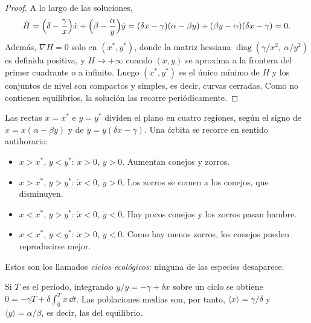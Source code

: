 \begin{proof}
A lo largo de las soluciones,
\[
  \dot H=\Bigl(\delta-\frac{\gamma}{x}\Bigr)\dot x+\Bigl(\beta-\frac{\alpha}{y}\Bigr)\dot y
  =(\delta x-\gamma)(\alpha-\beta y)+(\beta y-\alpha)(\delta x-\gamma)=0 .
\]
Además, $\nabla H=0$ solo en $(x^\ast,y^\ast)$, donde la matriz hessiana $\operatorname{diag}(\gamma/x^2,\ \alpha/y^2)$ es definida positiva, y $H\to+\infty$ cuando $(x,y)$ se aproxima a la frontera del primer cuadrante o a infinito. Luego $(x^\ast,y^\ast)$ es el único mínimo de $H$ y los conjuntos de nivel son compactos y simples, es decir, curvas cerradas. Como no contienen equilibrios, la solución las recorre periódicamente.
\end{proof}

\begin{desarrollo}
Las rectas $x=x^\ast$ e $y=y^\ast$ dividen el plano en cuatro regiones, según el signo de $\dot x=x(\alpha-\beta y)$ y de $\dot y=y(\delta x-\gamma)$. Una órbita se recorre en sentido antihorario:
\begin{itemize}
  \item[\textbf{(I)}] $x>x^\ast$, $y<y^\ast$: $\dot x>0$, $\dot y>0$. Aumentan conejos y zorros.
  \item[\textbf{(II)}] $x>x^\ast$, $y>y^\ast$: $\dot x<0$, $\dot y>0$. Los zorros se comen a los conejos, que disminuyen.
  \item[\textbf{(III)}] $x<x^\ast$, $y>y^\ast$: $\dot x<0$, $\dot y<0$. Hay pocos conejos y los zorros pasan hambre.
  \item[\textbf{(IV)}] $x<x^\ast$, $y<y^\ast$: $\dot x>0$, $\dot y<0$. Como hay menos zorros, los conejos pueden reproducirse mejor.
\end{itemize}
Estos son los llamados \emph{ciclos ecológicos}: ninguna de las especies desaparece.
\end{desarrollo}

\begin{remark}
Si $T$ es el periodo, integrando $\dot y/y=-\gamma+\delta x$ sobre un ciclo se obtiene $0=-\gamma T+\delta\int_0^T x\,\dd t$. Las poblaciones medias son, por tanto, $\langle x\rangle=\gamma/\delta$ y $\langle y\rangle=\alpha/\beta$, es decir, las del equilibrio.
\end{remark}

